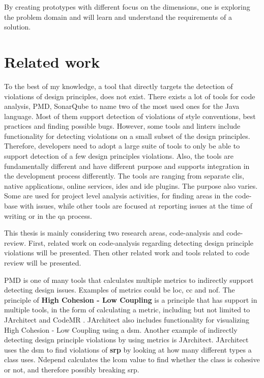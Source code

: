 \documentclass[pdftex,10pt,b5paper,twoside]{report}
\begin{document}
By creating prototypes with different focus on the dimensions, one is exploring the problem domain and will learn and understand the requirements of a solution.
\cleardoublepage
\chapter{Related work}
\label{relatedwork}

To the best of my knowledge, a tool that directly targets the detection of violations of design principles, does not exist. There exists a lot of tools for code analysis, PMD\cite{pmd}, SonarQube\cite{sonarqube} to name two of the most used ones for the Java language. Most of them support detection of violations of style conventions, best practices and finding possible bugs. However, some tools and linters include functionality for detecting violations on a small subset of the design principles. Therefore, developers need to adopt a large suite of tools to only be able to support detection of a few design principles violations. Also, the tools are fundamentally different and have different purpose and supports integration in the development process differently. The tools are ranging from separate \gls{cli}s, native applications, online services, \gls{ide}s and \gls{ide} plugins. The purpose also varies. Some are used for project level analysis activities, for finding areas in the code-base with issues, while other tools are focused at reporting issues at the time of writing or in the \gls{qa} process. 

This thesis is mainly considering two research areas, code-analysis and code-review. First, related work on code-analysis regarding detecting design principle violations will be presented. Then other related work and tools related to code review will be presented.

PMD \cite{pmd} is one of many tools that calculates multiple metrics to indirectly support detecting design issues. Examples of metrics could be \gls{loc}, \gls{cc} and \gls{nof}. The principle of \textbf{High Cohesion - Low Coupling} is a principle that has support in multiple tools, in the form of calculating a metric, including but not limited to JArchitect \cite{jarchitect} and CodeMR \cite{codemr}. JArchitect \cite{jarchitect} also includes functionality for visualizing High Cohesion - Low Coupling using a \gls{dsm}. Another example of indirectly detecting design principle violations by using metrics is JArchitect. JArchitect uses the \gls{dsm} to find violations of \textbf{\gls{srp}} by looking at how many different types a class uses. Ndepend \cite{ndepend} calculates the \gls{lcom} value to find whether the class is cohesive or not, and therefore possibly breaking \gls{srp}. 
\end{document}
